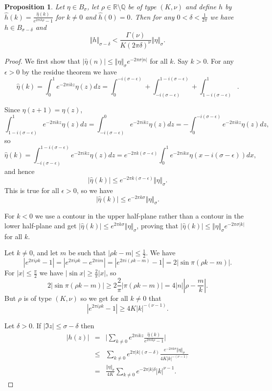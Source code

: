 \documentclass{article}
\newcommand{\norm}[1]{\Vert #1 \Vert}
\newtheorem{prop}[theorem]{Proposition}
\begin{document}
\begin{prop}
\label{hestimate}
Let $\eta \in B_\sigma$, let $\rho \in \mathbb{R} \setminus \mathbb{Q}$ be of type $(K,\nu)$ and define $h$ by
$\widehat{h}(k)=\frac{\widehat{\eta}(k)}{e^{2\pi i k\rho}-1}$ for $k \neq 0$ and $\widehat{h}(0)=0$.
Then for any $0<\delta<\frac{1}{2\pi}$ we have
 $h \in B_{\sigma-\delta}$ and
\[
\norm{h}_{\sigma-\delta} < \frac{\Gamma(\nu)}{K(2\pi \delta)^\nu}\norm{\eta}_\sigma.
\]
\end{prop}
\begin{proof}

We first show that $|\widehat{\eta}(n)| \leq \norm{\eta}_\sigma e^{-2\pi \sigma|n|}$ for all $k$. Say $k>0$.
For any $\epsilon>0$ by the residue theorem we have
\[
\widehat{\eta}(k)=\int_0^1 e^{-2\pi i kz} \eta(z) dz = 
\int_0^{-i(\sigma-\epsilon)}+\int_{-i(\sigma-\epsilon)}^{1-i(\sigma-\epsilon)}
+\int_{1-i(\sigma-\epsilon)}^1.
\]

Since $\eta(z+1)=\eta(z)$,
\[
\int_{1-i(\sigma-\epsilon)}^1 e^{-2\pi i kz} \eta(z) dz
= \int_{-i(\sigma-\epsilon)}^0 e^{-2\pi ikz}\eta(z)dz
=-\int_0^{-i(\sigma-\epsilon)} e^{-2\pi ikz}\eta(z)dz,
\]
so
\[
\widehat{\eta}(k)=\int_{-i(\sigma-\epsilon)}^{1-i(\sigma-\epsilon)}  e^{-2\pi i kz} \eta(z) dz
= e^{-2\pi  k(\sigma-\epsilon)} \int_0^1 e^{-2\pi i kx} \eta(x-i(\sigma-\epsilon)) dx,
\]
and hence
\[
|\widehat{\eta}(k)| \leq e^{-2\pi  k(\sigma-\epsilon)} \norm{\eta}_\sigma.
\]
This is true for all $\epsilon>0$, so we have
\[
|\widehat{\eta}(k)| \leq e^{-2\pi  k\sigma} \norm{\eta}_\sigma.
\]

For $k<0$ we use a contour in the upper half-plane rather than a contour in the lower half-plane and
get $|\widehat{\eta}(k)| \leq e^{2\pi  k\sigma} \norm{\eta}_\sigma$, proving that $|\widehat{\eta}(k)| \leq \norm{\eta}_\sigma e^{-2\pi \sigma|k|}$ for all $k$.

Let $k \neq 0$, and let $m$ be such that $|\rho k-m|\leq \frac{1}{2}$. We have
\[
|e^{2\pi i \rho k}-1|
=|e^{2\pi i\rho k}-e^{2\pi im}|
=|e^{2\pi i(\rho k-m)}-1|
=2|\sin \pi(\rho k-m)|.
\]
For $|x| \leq \frac{\pi}{2}$ we have $|\sin x| \geq \frac{2}{\pi}|x|$, so
\[
2|\sin \pi(\rho k-m)| \geq 2 \frac{2}{\pi} |\pi(\rho k-m)|
=4|n||\rho-\frac{m}{k}|.
\]
But $\rho$ is of type $(K,\nu)$ so we get for all $k \neq 0$ that
\[
|e^{2\pi i \rho k}-1| \geq 4K|k|^{-(\nu-1)}.
\]

Let $\delta>0$.
If $|\Im z| \leq \sigma-\delta$ then 
\begin{eqnarray*}
|h(z)|&=&\Big| \sum_{k \neq 0}  e^{2\pi ikz} \frac{\widehat{\eta}(k)}{e^{2\pi i k\rho}-1} \Big|\\
&\leq&\sum_{k \neq 0} e^{2\pi |k|(\sigma-\delta)} \frac{e^{-2\pi  k\sigma} \norm{\eta}_\sigma}{4K|k|^{-(\nu-1)}}\\
&=&\frac{\norm{\eta}_\sigma}{4K} \sum_{k \neq 0} e^{-2\pi |k|\delta} |k|^{\nu-1}.
\end{eqnarray*}


\end{proof}
\end{document}
